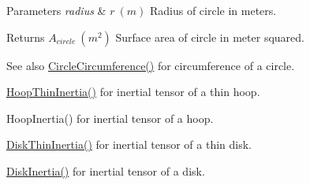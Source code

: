 \begin{DoxyParams}{Parameters}
{\em radius} & $ r\ (m)$ Radius of circle in meters. \\
\hline
\end{DoxyParams}
\begin{DoxyReturn}{Returns}
$ A_{circle}\ (m^2)$ Surface area of circle in meter squared. 
\end{DoxyReturn}
\begin{DoxySeeAlso}{See also}
\mbox{\hyperlink{group___e_g_x_math-_geometry-2_d-_circle_gadb55695b75a06a3f3534494eb767e18e}{Circle\+Circumference()}} for circumference of a circle. 

\mbox{\hyperlink{group___e_g_x_math-_geometry-3_d-_hoop_gab3a84dc2aa29ce0db990425747d291c6}{Hoop\+Thin\+Inertia()}} for inertial tensor of a thin hoop. 

Hoop\+Inertia() for inertial tensor of a hoop. 

\mbox{\hyperlink{group___e_g_x_math-_geometry-3_d-_disk_ga8dcadf6cd5680294a84311c6767e3caf}{Disk\+Thin\+Inertia()}} for inertial tensor of a thin disk. 

\mbox{\hyperlink{group___e_g_x_math-_geometry-3_d-_disk_ga6ed461694b277e36a641a6550bdea68f}{Disk\+Inertia()}} for inertial tensor of a disk. 
\end{DoxySeeAlso}
